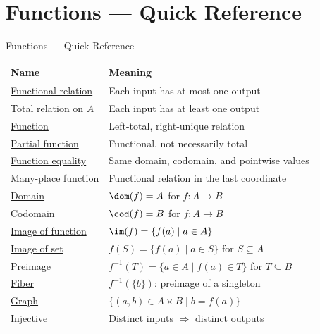 \section{Functions --- Quick Reference}


\begin{toolkitbox}{Functions --- Quick Reference}
\small
\begin{tabular}{l l}
\toprule
\textbf{Name}  & \textbf{Meaning} \\
\midrule
\hyperref[def:functional-relation]{Functional relation}  & Each input has at most one output                         \\
\hyperref[def:total-relation-on-domain]{Total relation on $A$}  & Each input has at least one output                       \\
\hyperref[def:function]{Function}          & Left-total, right-unique relation                            \\
\hyperref[def:partial-function]{Partial function}  & Functional, not necessarily total                            \\
\hyperref[def:function-equality]{Function equality}  & Same domain, codomain, and pointwise values                 \\
\hyperref[def:many-place-functional-relation]{Many-place function}  & Functional relation in the last coordinate                 \\
\hyperref[def:domain]{Domain}            & $\dom(f)=A$ for $f:A\to B$                                 \\
\hyperref[def:codomain]{Codomain}          & $\cod(f)=B$ for $f:A\to B$                                  \\
\hyperref[def:image-function]{Image of function}  & $\im(f) = \{f(a) \mid a \in A\}$                            \\
\hyperref[def:image-set]{Image of set}       & $f(S) = \{f(a) \mid a \in S\}$ for $S \subseteq A$          \\
\hyperref[def:preimage]{Preimage}           & $f^{-1}(T) = \{a \in A \mid f(a) \in T\}$ for $T \subseteq B$ \\
\hyperref[def:fiber]{Fiber}              & $f^{-1}(\{b\})$: preimage of a singleton                    \\
\hyperref[def:graph]{Graph}              & $\{(a,b) \in A\times B \mid b = f(a)\}$                     \\
\hyperref[def:injective]{Injective}          & Distinct inputs $\Rightarrow$ distinct outputs               \\

\end{tabular}
\end{toolkitbox}
